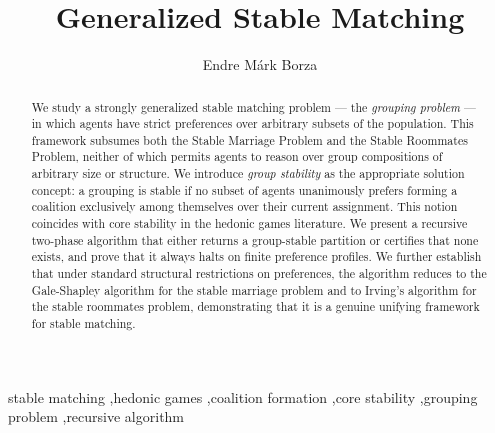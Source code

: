 \documentclass{elsarticle}
\begin{document}

\begin{frontmatter}

\title{Generalized Stable Matching}


\author{Endre Márk Borza}%




\begin{abstract}
We study a strongly generalized stable matching problem --- the \emph{grouping problem} --- in which agents have strict preferences over arbitrary subsets of the population. This framework subsumes both the Stable Marriage Problem and the Stable Roommates Problem, neither of which permits agents to reason over group compositions of arbitrary size or structure. We introduce \emph{group stability} as the appropriate solution concept: a grouping is stable if no subset of agents unanimously prefers forming a coalition exclusively among themselves over their current assignment. This notion coincides with core stability in the hedonic games literature. We present a recursive two-phase algorithm that either returns a group-stable partition or certifies that none exists, and prove that it always halts on finite preference profiles. We further establish that under standard structural restrictions on preferences, the algorithm reduces to the Gale-Shapley algorithm for the stable marriage problem and to Irving's algorithm for the stable roommates problem, demonstrating that it is a genuine unifying framework for stable matching.
\end{abstract}

\begin{keyword}
stable matching \sep hedonic games \sep coalition formation \sep core stability \sep grouping problem \sep recursive algorithm
\end{keyword}

\end{frontmatter}




\end{document}
